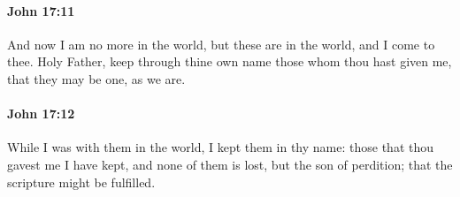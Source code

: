 		\paragraph{John 17:11} %
			\label{JOHN-17-11}

			And now I am no more in the world, but these are in the world, and I come to thee. Holy Father, keep through thine own name those whom thou hast given me, that they may be one, as we are.

			\begin{framed}
				\scriptsize
				\begin{compactdesc}
					\item[SBLG] 
				\end{compactdesc}
			\end{framed}

		\paragraph{John 17:12} %
			\label{JOHN-17-12}

			While I was with them in the world, I kept them in thy name: those that thou gavest me I have kept, and none of them is lost, but the son of perdition; that the scripture might be fulfilled.

